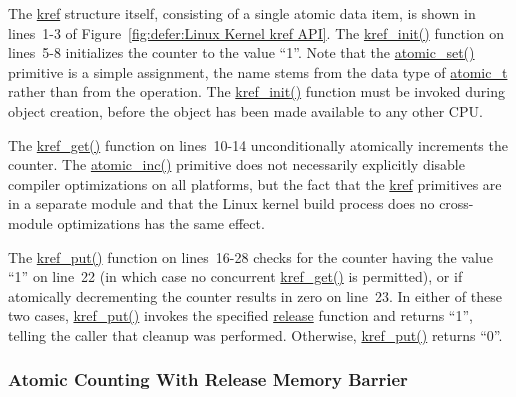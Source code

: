 The \url{kref} structure itself, consisting of a single atomic
data item, is shown in lines~1-3 of
Figure~\ref{fig:defer:Linux Kernel kref API}.
The \url{kref_init()} function on lines~5-8 initializes the counter
to the value ``1''.
Note that the \url{atomic_set()} primitive is a simple
assignment, the name stems from the data type of \url{atomic_t}
rather than from the operation.
The \url{kref_init()} function must be invoked during object creation,
before the object has been made available to any other CPU.

The \url{kref_get()} function on lines~10-14 unconditionally atomically
increments the counter.
The \url{atomic_inc()} primitive does not necessarily explicitly
disable compiler
optimizations on all platforms, but the fact that the \url{kref}
primitives are in a separate module and that the Linux kernel build
process does no cross-module optimizations has the same effect.

The \url{kref_put()} function on lines~16-28 checks for the counter having the
value ``1'' on line~22
(in which case no concurrent \url{kref_get()} is permitted),
or if atomically decrementing the counter results in zero on line~23.
In either of these two cases, \url{kref_put()} invokes the
specified \url{release} function and returns ``1'', telling the
caller that cleanup was performed.
Otherwise, \url{kref_put()} returns ``0''.

 \QuickQuizEnd

 \QuickQuizEnd

\subsubsection{Atomic Counting With Release Memory Barrier}
\label{sec:defer:Atomic Counting With Release Memory Barrier}

